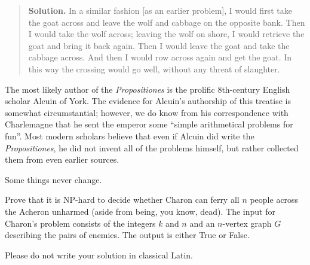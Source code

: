 \begin{exercises}
{\begin{quote}
\textbf{Solution.} In a similar fashion [as an earlier problem], I would first take the goat across and leave the wolf and cabbage on the opposite bank. Then I would take the wolf across; leaving the wolf on shore, I would retrieve the goat and bring it back again. Then I would leave the goat and take the cabbage across. And then I would row across again and get the goat. In this way the crossing would go well, without any threat of slaughter.
\end{quote}
The most likely author of the \textit{Propositiones} is the prolific 8th-century English scholar Alcuin of York. The evidence for Alcuin’s authorship of this treatise is somewhat circumstantial; however, we do know from his correspondence with Charlemagne that he sent the emperor some “simple arithmetical problems for fun”. Most modern scholars believe that even if Alcuin did write the \textit{Propositiones}, he did not invent all of the problems himself, but rather collected them from even earlier sources.

Some things never change.}

Prove that it is NP-hard to decide whether Charon can ferry all $n$ people across the Acheron unharmed (aside from being, you know, dead). The input for Charon’s problem consists of the integers $k$ and $n$ and an $n$-vertex graph $G$ describing the pairs of enemies. The output is either True or False.

Please do not write your solution in classical Latin.

\end{exercises}

